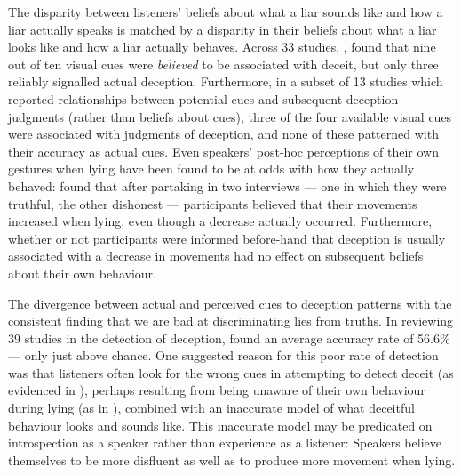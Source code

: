 \documentclass[a4paper,man,natbib]{apa6}
\begin{document}
The disparity between listeners' beliefs about what a liar sounds like and how a liar actually speaks is matched by a disparity in their beliefs about what a liar looks like and how a liar actually behaves.
Across 33 studies, \citet{Zuckerman1981}, found that nine out of ten visual cues were \emph{believed} to be associated with deceit, but only three reliably signalled actual deception.
Furthermore, in a subset of 13 studies which reported relationships between potential cues and subsequent deception judgments (rather than beliefs about cues), three of the four available visual cues were associated with judgments of deception, and none of these patterned with their accuracy as actual cues.  
Even speakers' post-hoc perceptions of their own gestures when lying have been found to be at odds with how they actually behaved:
\citet{Vrij1996} found that after partaking in two interviews --- one in which they were truthful, the other dishonest --- participants believed that their movements increased when lying, even though a decrease actually occurred.
Furthermore, whether or not participants were informed before-hand that deception is usually associated with a decrease in movements had no effect on subsequent beliefs about their own behaviour.

The divergence between actual and perceived cues to deception patterns with the consistent finding that we are bad at discriminating lies from truths. %
In reviewing 39 studies in the detection of deception, \citet{Vrij2000} found an average accuracy rate of 56.6\% --- only just above chance. 
One suggested reason for this poor rate of detection was that listeners often look for the wrong cues in attempting to detect deceit (as evidenced in \citealt{DePaulo1982}), perhaps resulting from being unaware of their own behaviour during lying (as in \citealt{Vrij1996}), combined with an inaccurate model of what deceitful behaviour looks and sounds like. 
This inaccurate model may be predicated on introspection as a speaker rather than experience as a listener: Speakers believe themselves to be more disfluent \citep{Zuckerman1981a} as well as to produce more movement \citep{Vrij1996} when lying. 
\end{document}
